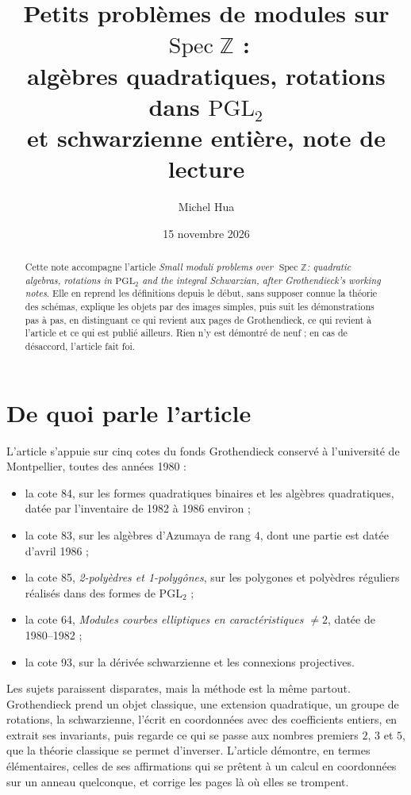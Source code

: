 \documentclass[11pt,a4paper]{amsart}
\title[Note de lecture : petits problèmes de modules sur $\operatorname{Spec}\mathbb Z$]{Petits problèmes de modules sur $\operatorname{Spec}\mathbb Z$ :\\ algèbres quadratiques, rotations dans $\mathrm{PGL}_2$\\ et schwarzienne entière, note de lecture}
\author{Michel Hua}
\date{15 novembre 2026}
\theoremstyle{definition}
\theoremstyle{plain}
\theoremstyle{remark}
\theoremstyle{plain}
\newcommand{\PGL}{\mathrm{PGL}_2}
\begin{document}
\maketitle

\begin{abstract}
Cette note accompagne l'article \emph{Small moduli problems over $\operatorname{Spec}\mathbb Z$: quadratic algebras, rotations in $\mathrm{PGL}_2$ and the integral Schwarzian, after Grothendieck's working notes}. Elle en reprend les définitions depuis le début, sans supposer connue la théorie des schémas, explique les objets par des images simples, puis suit les démonstrations pas à pas, en distinguant ce qui revient aux pages de Grothendieck, ce qui revient à l'article et ce qui est publié ailleurs. Rien n'y est démontré de neuf ; en cas de désaccord, l'article fait foi.
\end{abstract}

\section{De quoi parle l'article}

L'article s'appuie sur cinq cotes du fonds Grothendieck conservé à l'université de Montpellier, toutes des années 1980 :
\begin{itemize}
\item la cote 84, sur les formes quadratiques binaires et les algèbres quadratiques, datée par l'inventaire de 1982 à 1986 environ ;
\item la cote 83, sur les algèbres d'Azumaya de rang $4$, dont une partie est datée d'avril 1986 ;
\item la cote 85, \emph{2-polyèdres et 1-polygônes}, sur les polygones et polyèdres réguliers réalisés dans des formes de $\PGL$ ;
\item la cote 64, \emph{Modules courbes elliptiques en caractéristiques $\neq 2$}, datée de 1980--1982 ;
\item la cote 93, sur la dérivée schwarzienne et les connexions projectives.
\end{itemize}

Les sujets paraissent disparates, mais la méthode est la même partout. Grothendieck prend un objet classique, une extension quadratique, un groupe de rotations, la schwarzienne, l'écrit en coordonnées avec des coefficients entiers, en extrait ses invariants, puis regarde ce qui se passe aux nombres premiers $2$, $3$ et $5$, que la théorie classique se permet d'inverser. L'article démontre, en termes élémentaires, celles de ses affirmations qui se prêtent à un calcul en coordonnées sur un anneau quelconque, et corrige les pages là où elles se trompent.
\end{document}
